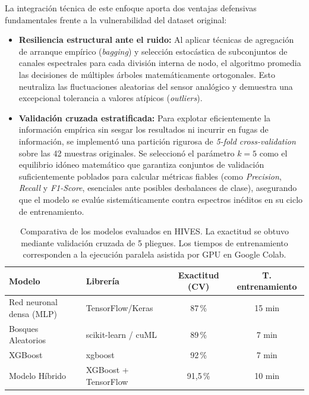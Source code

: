 La integración técnica de este enfoque aporta dos ventajas defensivas fundamentales frente a la vulnerabilidad del dataset original:

\begin{itemize}
    \item \textbf{Resiliencia estructural ante el ruido:} Al aplicar técnicas de agregación de arranque empírico (\textit{bagging}) y selección estocástica de subconjuntos de canales espectrales para cada división interna de nodo, el algoritmo promedia las decisiones de múltiples árboles matemáticamente ortogonales. Esto neutraliza las fluctuaciones aleatorias del sensor analógico y demuestra una excepcional tolerancia a valores atípicos (\textit{outliers}).
    \item \textbf{Validación cruzada estratificada:} Para explotar eficientemente la información empírica sin sesgar los resultados ni incurrir en fugas de información, se implementó una partición rigurosa de \textit{5-fold cross-validation} sobre las 42 muestras originales. Se seleccionó el parámetro $k=5$ como el equilibrio idóneo matemático que garantiza conjuntos de validación suficientemente poblados para calcular métricas fiables (como \textit{Precision}, \textit{Recall} y \textit{F1-Score}, esenciales ante posibles desbalances de clase), asegurando que el modelo se evalúe sistemáticamente contra espectros inéditos en su ciclo de entrenamiento.
\end{itemize}

\begin{table}[h]
  \centering
  \begin{tabularx}{\textwidth}{>{\raggedright\arraybackslash}X >{\raggedright\arraybackslash}X c c}
    \toprule
    \textbf{Modelo} & \textbf{Librería} & \textbf{Exactitud (CV)} & \textbf{T. entrenamiento} \\
    \midrule
    Red neuronal densa (MLP) & TensorFlow/Keras & 87\,\% & 15 min \\ \hline
    Bosques Aleatorios       & scikit-learn / cuML  & 89\,\% &  7 min \\ \hline
    XGBoost                  & xgboost          & 92\,\% &  7 min \\ \hline
    Modelo Híbrido           & XGBoost + TensorFlow &  91,5\,\% & 10 min \\
    \bottomrule
  \end{tabularx}
  \caption{Comparativa de los modelos evaluados en HIVES. La exactitud se obtuvo mediante validación cruzada de 5 pliegues. Los tiempos de entrenamiento corresponden a la ejecución paralela asistida por GPU en Google Colab.}
\end{table}

